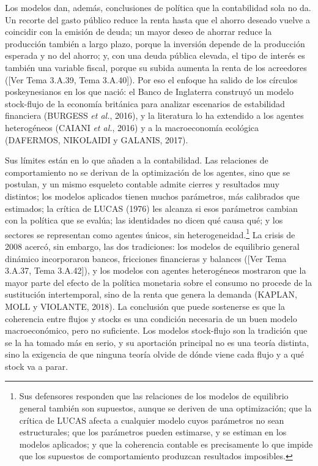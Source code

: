 \documentclass[10pt,a4paper]{article}
\newcommand{\authorfont}[1]{{\fontfamily{EBGaramond-TLF}\selectfont #1}}
\begin{document}
Los modelos dan, además, conclusiones de política que la contabilidad sola no da. Un recorte del gasto público reduce la renta hasta que el ahorro deseado vuelve a coincidir con la emisión de deuda; un mayor deseo de ahorrar reduce la producción también a largo plazo, porque la inversión depende de la producción esperada y no del ahorro; y, con una deuda pública elevada, el tipo de interés es también una variable fiscal, porque su subida aumenta la renta de los acreedores ([\authorfont{Ver Tema 3.A.39, Tema 3.A.40}]). Por eso el enfoque ha salido de los círculos poskeynesianos en los que nació: el Banco de Inglaterra construyó un modelo stock-flujo de la economía británica para analizar escenarios de estabilidad financiera (BURGESS \textit{et al.}, 2016), y la literatura lo ha extendido a los agentes heterogéneos (CAIANI \textit{et al.}, 2016) y a la macroeconomía ecológica (DAFERMOS, NIKOLAIDI y GALANIS, 2017).

Sus límites están en lo que añaden a la contabilidad. Las relaciones de comportamiento no se derivan de la optimización de los agentes, sino que se postulan, y un mismo esqueleto contable admite cierres y resultados muy distintos; los modelos aplicados tienen muchos parámetros, más calibrados que estimados; la crítica de LUCAS (1976) les alcanza si esos parámetros cambian con la política que se evalúa; las identidades no dicen qué causa qué; y los sectores se representan como agentes únicos, sin heterogeneidad.\footnote{%
    Sus defensores responden que las relaciones de los modelos de equilibrio general también son supuestos, aunque se deriven de una optimización; que la crítica de LUCAS afecta a cualquier modelo cuyos parámetros no sean estructurales; que los parámetros pueden estimarse, y se estiman en los modelos aplicados; y que la coherencia contable es precisamente lo que impide que los supuestos de comportamiento produzcan resultados imposibles.
} La crisis de 2008 acercó, sin embargo, las dos tradiciones: los modelos de equilibrio general dinámico incorporaron bancos, fricciones financieras y balances ([\authorfont{Ver Tema 3.A.37, Tema 3.A.42}]), y los modelos con agentes heterogéneos mostraron que la mayor parte del efecto de la política monetaria sobre el consumo no procede de la sustitución intertemporal, sino de la renta que genera la demanda (KAPLAN, MOLL y VIOLANTE, 2018). La conclusión que puede sostenerse es que la coherencia entre flujos y stocks es una condición necesaria de un buen modelo macroeconómico, pero no suficiente. Los modelos stock-flujo son la tradición que se la ha tomado más en serio, y su aportación principal no es una teoría distinta, sino la exigencia de que ninguna teoría olvide de dónde viene cada flujo y a qué stock va a parar.
\end{document}
